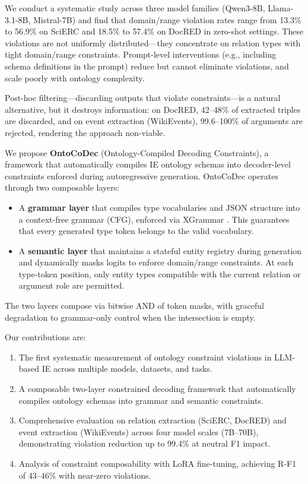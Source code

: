 \documentclass[11pt]{article}
\begin{document}
We conduct a systematic study across three model families (Qwen3-8B, Llama-3.1-8B, Mistral-7B) and find that domain/range violation rates range from 13.3\% to 56.9\% on SciERC \cite{luan2018multi} and 18.5\% to 57.4\% on DocRED \cite{yao2019docred} in zero-shot settings.
These violations are not uniformly distributed---they concentrate on relation types with tight domain/range constraints.
Prompt-level interventions (e.g., including schema definitions in the prompt) reduce but cannot eliminate violations, and scale poorly with ontology complexity.

Post-hoc filtering---discarding outputs that violate constraints---is a natural alternative, but it destroys information: on DocRED, 42--48\% of extracted triples are discarded, and on event extraction (WikiEvents), 99.6--100\% of arguments are rejected, rendering the approach non-viable.

We propose \textbf{OntoCoDec} (Ontology-Compiled Decoding Constraints), a framework that automatically compiles IE ontology schemas into decoder-level constraints enforced during autoregressive generation.
OntoCoDec operates through two composable layers:
\begin{itemize}
\item A \textbf{grammar layer} that compiles type vocabularies and JSON structure into a context-free grammar (CFG), enforced via XGrammar \cite{dong2024xgrammar}. This guarantees that every generated type token belongs to the valid vocabulary.
\item A \textbf{semantic layer} that maintains a stateful entity registry during generation and dynamically masks logits to enforce domain/range constraints. At each type-token position, only entity types compatible with the current relation or argument role are permitted.
\end{itemize}
The two layers compose via bitwise AND of token masks, with graceful degradation to grammar-only control when the intersection is empty.

Our contributions are:
\begin{enumerate}
\item The first systematic measurement of ontology constraint violations in LLM-based IE across multiple models, datasets, and tasks.
\item A composable two-layer constrained decoding framework that automatically compiles ontology schemas into grammar and semantic constraints.
\item Comprehensive evaluation on relation extraction (SciERC, DocRED) and event extraction (WikiEvents) across four model scales (7B--70B), demonstrating violation reduction up to 99.4\% at neutral F1 impact.
\item Analysis of constraint composability with LoRA fine-tuning, achieving R-F1 of 43--46\% with near-zero violations.
\end{enumerate}
\end{document}
